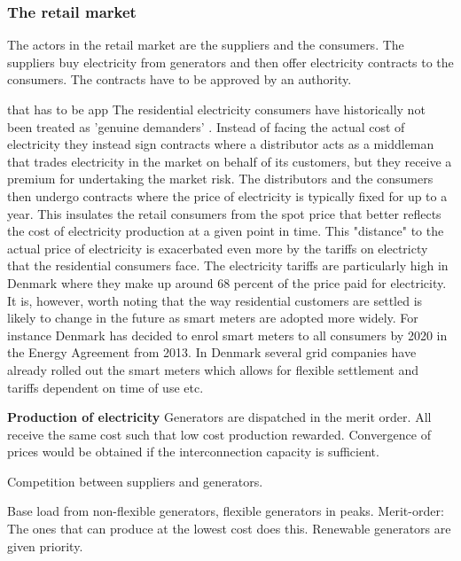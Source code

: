 \subsubsection{The retail market} %
\label{subsubsec: t_resmarket}
The actors in the retail market are the suppliers and the consumers. The suppliers buy electricity from generators and then offer electricity contracts to the consumers. The contracts have to be approved by an authority. 


that has to be app
The residential electricity consumers have historically not been treated as 'genuine demanders' \citep{kirschen2003demand}. Instead of facing the actual cost of electricity they instead sign contracts where a distributor acts as a middleman that trades electricity in the market on behalf of its customers, but they receive a premium for undertaking the market risk. The distributors and the consumers then undergo contracts where the price of electricity is typically fixed for up to a year. This insulates the retail consumers from the spot price that better reflects the cost of electricity production at a given point in time. This "distance" to the actual price of electricity is exacerbated even more by the tariffs on electricty that the residential consumers face. The electricity tariffs are particularly high in Denmark where they make up around 68 percent of the price paid for electricity. \smallskip \\ 

It is, however, worth noting that the way residential customers are settled is likely to change in the future as smart meters are adopted more widely. For instance Denmark has decided to enrol smart meters to all consumers by 2020 in the Energy Agreement from 2013. In Denmark several grid companies have already rolled out the smart meters which allows for flexible settlement and tariffs dependent on time of use etc. 


\textbf{Production of electricity }
Generators are dispatched in the merit order. All receive the same cost such that low cost production rewarded. Convergence of prices would be obtained if the interconnection capacity is sufficient. 

Competition between suppliers and generators. 



Base load from non-flexible generators, flexible generators in peaks. Merit-order: The ones that can produce at the lowest cost does this. Renewable generators are given priority. 


